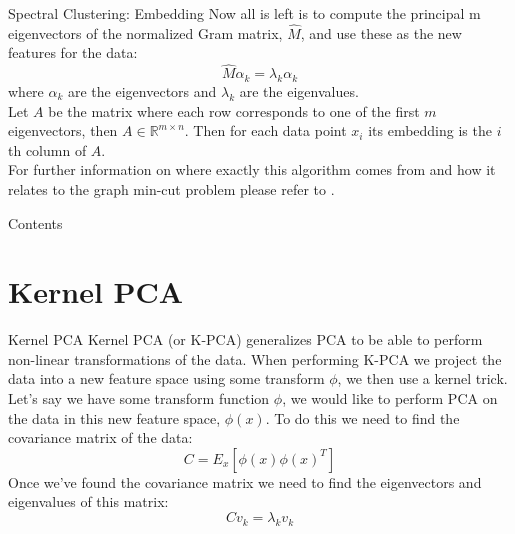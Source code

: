 \documentclass[aspectratio=169]{beamer}
\begin{document}
\begin{frame}{Spectral Clustering: Embedding}
  Now all is left is to compute the principal m eigenvectors of the normalized Gram matrix, $\hat{M}$, and use these as the new features for the data:
  \begin{equation*}
    \hat{M} \alpha_{k} = \lambda_{k} \alpha_{k}
  \end{equation*}
  where $\alpha_{k}$ are the eigenvectors and $\lambda_{k}$ are the eigenvalues.
  \\ \hfill \break
  Let $A$ be the matrix where each row corresponds to one of the first $m$ eigenvectors, then $A \in \mathbb{R}^{m \times n}$. Then for each data point $x_{i}$ its embedding is the $i$th column of $A$. 
  \\ \hfill \break
  For further information on where exactly this algorithm comes from and how it relates to the graph min-cut problem please refer to \cite{ng2001spectral}.
\end{frame}

\begin{frame}{Contents}
  \tableofcontents
\end{frame}
\section{Kernel PCA}
\begin{frame}{Kernel PCA}
  Kernel PCA (or K-PCA) generalizes PCA to be able to perform non-linear transformations of the data. When performing K-PCA we project the data into a new feature space using some transform $\phi$, we then use a kernel trick. 
  \\ \hfill \break
  Let's say we have some transform function $\phi$, we would like to perform PCA on the data in this new feature space, $\phi(x)$. To do this we need to find the covariance matrix of the data:
  \begin{equation} \label{eq:kernel_pca_covariance}
    C = E_{x} \left[\phi(x)\phi(x)^{T}\right] 
  \end{equation}
  Once we've found the covariance matrix we need to find the eigenvectors and eigenvalues of this matrix:
  \begin{equation*}
    C v_{k} = \lambda_{k} v_{k}
  \end{equation*}
\end{frame}
\end{document}
